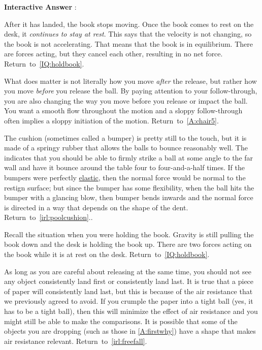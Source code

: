 \documentclass[11pt,letter,openany,makeidx]{book}
\newcommand{\return}[1]{{} \hfill \mbox{Return to \ref{#1}.}}
\newcommand{\autoreturn}[1]{{} \hfill \mbox{Return to \autoref{#1}.}}
\newcounter{AtIQ}
\renewcommand{\theAtIQ}{Answer \arabic{AtIQ}}
\newenvironment{AIQ}{\begin{list}{\textbf{Interactive \theAtIQ}:}{\usecounter{AtIQ} \leftmargin 12pt}}{\end{list}}
\begin{document}
\begin{AIQ}
\item\label{A:landedN} After it has landed, the book stops moving.  Once the book comes to rest on the desk, it \textit{continues to stay at rest}.  This says that the velocity is not changing, so the book is not accelerating.  That means that the book is in equilibrium. There are forces acting, but they cancel each other, resulting in no net force. \return{IQ:holdbook}
\item\label{A:FT} What does matter is not literally how you move \textit{after} the release, but rather how you move \textit{before} you release the ball. By paying attention to your follow-through, you are also changing the way you move before you release or impact the ball.  You want a smooth flow throughout the motion and a sloppy follow-through often implies a sloppy initiation of the motion.  \return{A:chair5}
\item\label{A:pool.bumper} The cushion (sometimes called a bumper) is pretty still to the touch, but it is made of a springy rubber that allows the balls to bounce reasonably well.  The  indicates that you should be able to firmly strike a ball at some angle to the far wall and have it bounce around the table four to four-and-a-half times.  If the bumpers were perfectly \hyperref[s:elastic]{elastic}, then the normal force would be normal to the restign surface; but since the bumper has some flexibility, when the ball hits the bumper with a glancing blow, then bumper bends inwards and the normal force is directed in a way that depends on the shape of the dent.  \autoreturn{irl:poolcushion}.
\item\label{A:zero} Recall the situation when you were holding the book.  Gravity is still pulling the book down and the desk is holding the book up.  There are two forces acting on the book while it is at rest on the desk. \return{IQ:holdbook}
\item\label{A:firstfall} As long as you are careful about releasing at the same time, you should not see any object consistently land first or consistently land last.  It is true that a piece of paper  will consistently land last, but this is because of the air resistance that we previously agreed to avoid.  If you crumple the paper into a tight ball (yes, it has to be a tight ball), then this will minimize the effect of air resistance and you might still be able to make the comparisons.   It is possible that some of the objects you are dropping (such as those in \ref{A:firstwhy}) have a shape that makes air resistance relevant.  \autoreturn{irl:freefall}

\end{AIQ}
\end{document}
